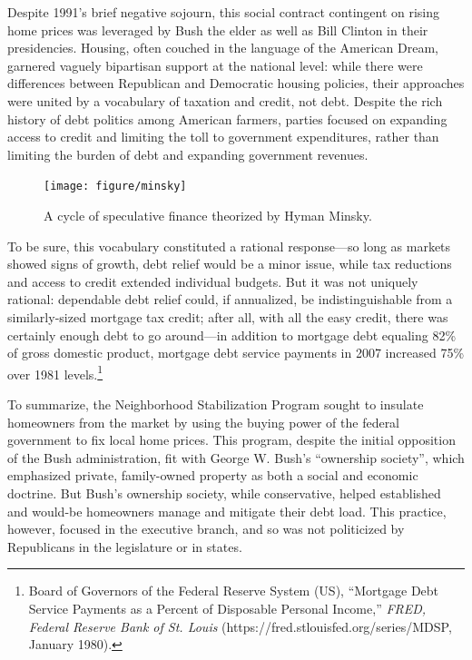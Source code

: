\documentclass[12pt,oneside]{psthesis}
\begin{document}
Despite 1991's brief negative sojourn, this social contract contingent on rising home prices was leveraged by Bush the elder as well as Bill Clinton in their presidencies.
Housing, often couched in the language of the American Dream, garnered vaguely bipartisan support at the national level: while there were differences between Republican and Democratic housing policies, their approaches were united by a vocabulary of taxation and credit, not debt.
Despite the rich history of debt politics among American farmers, parties focused on expanding access to credit and limiting the toll to government expenditures, rather than limiting the burden of debt and expanding government revenues.
\begin{figure}

{\centering \texttt{[image: figure/minsky]} 

}

\caption{A cycle of speculative finance theorized by Hyman Minsky.}\label{fig:minsky}
\end{figure}
To be sure, this vocabulary constituted a rational response---so long as markets showed signs of growth, debt relief would be a minor issue, while tax reductions and access to credit extended individual budgets.
But it was not uniquely rational: dependable debt relief could, if annualized, be indistinguishable from a similarly-sized mortgage tax credit; after all, with all the easy credit, there was certainly enough debt to go around---in addition to mortgage debt equaling 82\% of gross domestic product, mortgage debt service payments in 2007 increased 75\% over 1981 levels.\footnote{Board of Governors of the Federal Reserve System (US), ``Mortgage Debt Service Payments as a Percent of Disposable Personal Income,'' \emph{FRED, Federal Reserve Bank of St. Louis} (https://fred.stlouisfed.org/series/MDSP, January 1980).}

To summarize, the Neighborhood Stabilization Program sought to insulate homeowners from the market by using the buying power of the federal government to fix local home prices.
This program, despite the initial opposition of the Bush administration, fit with George W. Bush's ``ownership society'', which emphasized private, family-owned property as both a social and economic doctrine.
But Bush's ownership society, while conservative, helped established and would-be homeowners manage and mitigate their debt load.
This practice, however, focused in the executive branch, and so was not politicized by Republicans in the legislature or in states.
\end{document}
